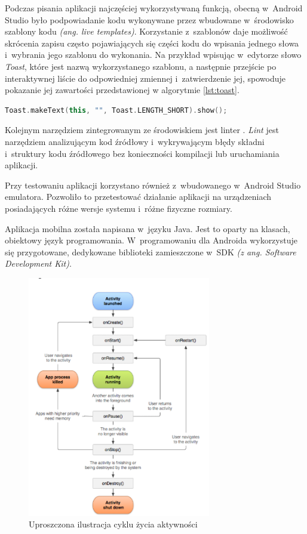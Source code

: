 \documentclass[a4paper,12pt, twoside]{article}
\begin{document}
        Podczas pisania aplikacji najczęściej wykorzystywaną funkcją, obecną w~Android Studio było podpowiadanie kodu wykonywane przez wbudowane w~środowisko szablony kodu \textit{(ang. live templates)}. Korzystanie z~szablonów daje możliwość skrócenia zapisu często pojawiających się części kodu do wpisania jednego słowa i~wybrania jego szablonu do wykonania. Na przykład wpisując w~edytorze słowo \textit{Toast}, które jest nazwą wykorzystanego szablonu, a następnie przejście po interaktywnej liście do odpowiedniej zmiennej i~zatwierdzenie jej, spowoduje pokazanie jej zawartości przedstawionej w algorytmie \ref{lst:toast}. 
    
    \begin{lstlisting}[language=C++, caption=Zawartość szablonu Toast, label={lst:toast}]
Toast.makeText(this, "", Toast.LENGTH_SHORT).show();\end{lstlisting}
    
        Kolejnym narzędziem zintegrowanym ze środowiskiem jest linter \cite{lint}. \textit{Lint} jest narzędziem analizującym kod źródłowy i~wykrywającym błędy składni i~struktury kodu źródłowego bez konieczności kompilacji lub uruchamiania aplikacji.
    
        Przy testowaniu aplikacji korzystano również z~wbudowanego w~Android Studio emulatora. Pozwoliło to przetestować działanie aplikacji na urządzeniach posiadających różne wersje systemu i~różne fizyczne rozmiary. 

    	Aplikacja mobilna została napisana w~języku Java. Jest to oparty na klasach, obiektowy język programowania. W~programowaniu dla Androida wykorzystuje się przygotowane, dedykowane biblioteki zamieszczone w~SDK\textit{ (z ang. Software Development Kit)}\cite{sdk}.
    
    	\begin{figure}[H]
    	        \centering
    			\includegraphics[width=8cm]{images/rys6_androidlifecycle.png}
    			\caption{Uproszczona ilustracja cyklu życia aktywności}
                \label{fig:lifecycle}
    	\end{figure}
    	
\end{document}

